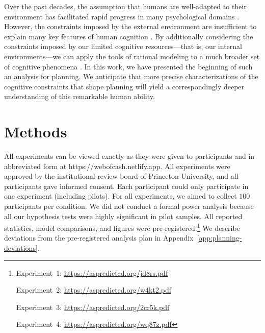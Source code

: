 
Over the past decades, the assumption that humans are well-adapted to their environment \citep{marr1982vision,anderson1990adaptive} has facilitated rapid progress in many psychological domains \citep{oaksford1994rational,gureckis2012selfdirected,tenenbaum2001generalization,anderson1991adaptive,ashby1995categorization,savage1954foundations}. However, the constraints imposed by the external environment are insufficient to explain many key features of human cognition \citep{rahnev2018suboptimality,lieder2020resourcerational}. By additionally considering the constraints imposed by our limited cognitive resources---that is, our internal environments---we can apply the tools of rational modeling to a much broader set of cognitive phenomena \citep{griffiths2015rational,lieder2020resourcerational}. In this work, we have presented the beginning of such an analysis for planning. We anticipate that more precise characterizations of the cognitive constraints that shape planning will yield a correspondingly deeper understanding of this remarkable human ability.


\section{Methods}\label{sec:planning-methods}

All experiments can be viewed exactly as they were given to participants and in abbreviated form at https://webofcash.netlify.app. All experiments were approved by the institutional review board of Princeton University, and all participants gave informed consent. Each participant could only participate in one experiment (including pilots). For all experiments, we aimed to collect $100$ participants per condition. We did not conduct a formal power analysis because all our hypothesis tests were highly significant in pilot samples. All reported statistics, model comparisons, and figures were pre-registered.\footnote{%
  Experiment~1: \url{https://aspredicted.org/jd8rs.pdf}\par
  Experiment~2: \url{https://aspredicted.org/w4kt2.pdf}\par
  Experiment~3: \url{https://aspredicted.org/2cr5k.pdf}\par
  Experiment~4: \url{https://aspredicted.org/wq87z.pdf}\par
} We describe deviations from the pre-registered analysis plan in Appendix~\ref{app:planning-deviations}.

